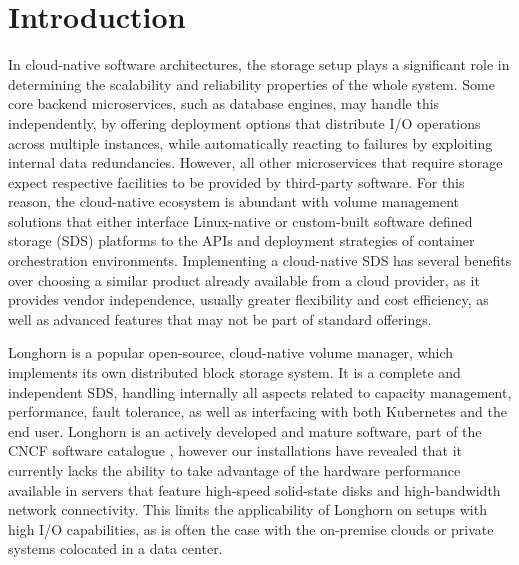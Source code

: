 \section{Introduction}

In cloud-native software architectures, the storage setup plays a significant role in determining the scalability and reliability properties of the whole system. Some core backend microservices, such as database engines, may handle this independently, by offering deployment options that distribute I/O operations across multiple instances, while automatically reacting to failures by exploiting internal data redundancies. However, all other microservices that require storage expect respective facilities to be provided by third-party software. For this reason, the cloud-native ecosystem is abundant with volume management solutions that either interface Linux-native or custom-built software defined storage (SDS) platforms to the APIs and deployment strategies of container orchestration environments. Implementing a cloud-native SDS has several benefits over choosing a similar product already available from a cloud provider, as it provides vendor independence, usually greater flexibility and cost efficiency, as well as advanced features that may not be part of standard offerings.

Longhorn \cite{longhorn} is a popular open-source, cloud-native volume manager, which implements its own distributed block storage system. It is a complete and independent SDS, handling internally all aspects related to capacity management, performance, fault tolerance, as well as interfacing with both Kubernetes and the end user. Longhorn is an actively developed and mature software, part of the CNCF software catalogue \cite{cncf}, however our installations have revealed that it currently lacks the ability to take advantage of the hardware performance available in servers that feature high-speed solid-state disks and high-bandwidth network connectivity.
This limits the applicability of Longhorn on setups with high I/O capabilities, as is often the case with the on-premise clouds or private systems colocated in a data center.

